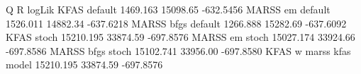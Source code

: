 \begin{Schunk}
\begin{Soutput}
                                Q        R    logLik
KFAS default             1469.163 15098.65 -632.5456
MARSS em default         1526.011 14882.34 -637.6218
MARSS bfgs default       1266.888 15282.69 -637.6092
KFAS stoch              15210.195 33874.59 -697.8576
MARSS em stoch          15027.174 33924.66 -697.8586
MARSS bfgs stoch        15102.741 33956.00 -697.8580
KFAS w marss kfas model 15210.195 33874.59 -697.8576
\end{Soutput}
\end{Schunk}
